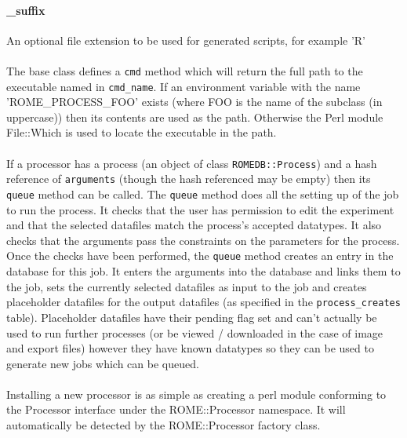 \paragraph{\_suffix}
An optional file extension to be used for generated scripts, for example 'R'

\paragraph{}
The base class defines a \texttt{cmd} method which will return the full path to the executable named in \texttt{cmd\_name}. If an environment variable with the name 'ROME\_PROCESS\_FOO' exists (where FOO is the name of the subclass (in uppercase)) then its contents are used as the path. Otherwise the Perl module File::Which is used to locate the executable in the path. 

\paragraph{}
If a processor has a process (an object of class \texttt{ROMEDB::Process}) and a hash reference of \texttt{arguments} (though the hash referenced may be empty) then its \texttt{queue} method can be called. The \texttt{queue} method does all the setting up of the job to run the process. It checks that the user has permission to edit the experiment and that the selected datafiles match the process's accepted datatypes. It also checks that the arguments pass the constraints on the parameters for the process. Once the checks have been performed, the \texttt{queue} method creates an entry in the database for this job. It enters the arguments into the database and links them to the job, sets the currently selected datafiles as input to the job and creates placeholder datafiles for the output datafiles (as specified in the \texttt{process\_creates} table). Placeholder datafiles have their pending flag set and can't actually be used to run further processes (or be viewed / downloaded in the case of image and export files) however they have known datatypes so they can be used to generate new jobs which can be queued.


\paragraph{}
Installing a new processor is as simple as creating a perl module conforming to the Processor interface under the ROME::Processor namespace. It will automatically be detected by the ROME::Processor factory class.







